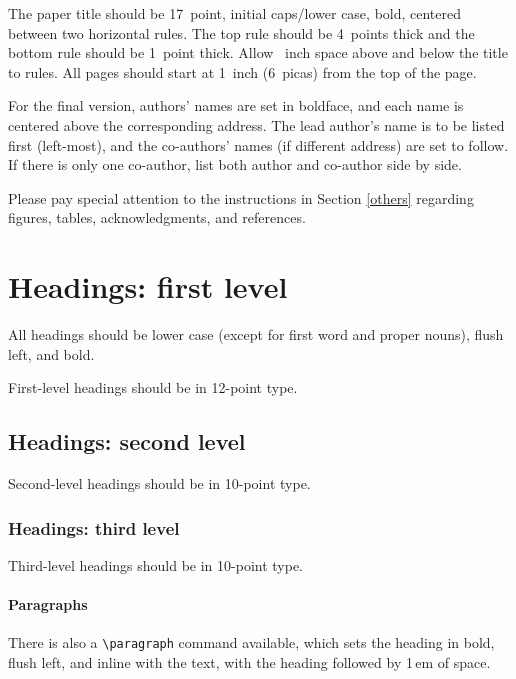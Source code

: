 \documentclass{article}
\begin{document}
The paper title should be 17~point, initial caps/lower case, bold,
centered between two horizontal rules. The top rule should be 4~points
thick and the bottom rule should be 1~point thick. Allow
~inch space above and below the title to rules. All
pages should start at 1~inch (6~picas) from the top of the page.

For the final version, authors' names are set in boldface, and each
name is centered above the corresponding address. The lead author's
name is to be listed first (left-most), and the co-authors' names (if
different address) are set to follow. If there is only one co-author,
list both author and co-author side by side.

Please pay special attention to the instructions in Section \ref{others}
regarding figures, tables, acknowledgments, and references.

\section{Headings: first level}
\label{headings}

All headings should be lower case (except for first word and proper
nouns), flush left, and bold.

First-level headings should be in 12-point type.

\subsection{Headings: second level}

Second-level headings should be in 10-point type.

\subsubsection{Headings: third level}

Third-level headings should be in 10-point type.

\paragraph{Paragraphs}

There is also a \verb+\paragraph+ command available, which sets the
heading in bold, flush left, and inline with the text, with the
heading followed by 1\,em of space.
\end{document}
